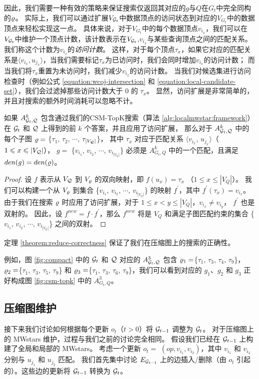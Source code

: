 因此，我们需要一种有效的策略来保证搜索仅返回其对应的$g$与$Q$在$G_t$中完全同构的$\varrho$。
实际上，我们可以通过扩展$V_{\mathcal{G}_t}$中数据顶点的访问状态到对应的$V_{G_t}$中的数据顶点来轻松实现这一点。
具体来说，对于$V_{G_t}$中的每个数据顶点$v_{i_x}$，我们可以在$V_{\mathcal{G}_t}$中维护一个顶点计数，该计数表示在$V_{\mathcal{G}_t}$,$v_{i_x}$与某些查询顶点之间的匹配关系。
我们称这个计数为$v_{i_x}$的\emph{访问计数}。
这样，对于每个顶点$\tau_x$，如果它对应的匹配关系是$\langle v_{i_x}, u_{j_x} \rangle$，当我们需要标记$\tau_x$为已访问时，我们会同时增加$v_{i_x}$的访问计数；
而当我们将$\tau_x$重置为未访问时，我们减少$v_{i_x}$的访问计数。
当我们对候选集进行访问检查时（例如公式 \ref{equation:wcoj-intersection} 和 \ref{equation:local-candidate-set}），我们会过滤掉那些访问计数大于 0 的 $\tau_x$。
显然，访问扩展是非常简单的，并且对搜索的额外时间消耗可以忽略不计。
\begin{theorem} \label{theorem:reduce-correctness}
如果 $A_{\mathcal{G}_t, \mathcal{Q}}^k$ 包含通过我们的CSM-TopK搜索（算法 \ref{alg:localmwstar:framework}）在 $\mathcal{G}_t$ 和 $\mathcal{Q}$ 上得到的前 $k$ 个答案，并且应用了访问扩展，
那么对于 $A_{\mathcal{G}_t, \mathcal{Q}}^k$ 中的每个子图 $\varrho=$ \{$\tau_1$, $\tau_2$, $\cdots$, $\tau_{|V_{\mathcal{Q}}|}$\}，
其中 $\tau_{x}$ 对应于匹配关系 $\langle v_{i_x}$, $u_{j_x}\rangle$（$1\leqslant x\leqslant |V_{\mathcal{Q}}|$），
$g=$ \{$v_{i_1}$, $v_{i_2}$, $\cdots$, $v_{i_{|V_Q|}}$\} 必须是 $A_{G_t, Q}^k$ 中的一个匹配，且满足 $den(g) = den(\varrho)$。
\end{theorem}
\begin{proof}
设 $f$ 表示从 $V_{\mathcal{Q}}$ 到 $V_{\varrho}$ 的双向映射，即 $f(u_x) = \tau_x$ （$1\leq x\leq |V_Q|$）。
我们可以构建一个从 $V_{\varrho}$ 到集合 \{$v_{i_1}$, $v_{i_2}$, $\cdots$, $v_{i_{|V_Q|}}$\} 的映射 $f^{\prime}$，其中 $f^{\prime}(\tau_x) = v_{i_x}$。
由于我们在搜索 $\varrho$ 时应用了访问扩展，对于 $1\leq x<y\leq |V_Q|$，$v_{i_x} \neq v_{i_y}$， $f^{\prime}$ 也是双射的。
因此，设 $f^{new} = f \cdot f^\prime$，那么 $f^{new}$ 将是 $V_Q$ 和满足子图匹配约束的集合 \{$v_{i_1}$, $v_{i_2}$, $\cdots$, $v_{i_{|V_Q|}}$\} 之间的双射。
\end{proof}
定理 \ref{theorem:reduce-correctness} 保证了我们在压缩图上的搜索的正确性。

例如，图 \ref{fig:compact} 中的 $\mathcal{G}_t$ 和 $\mathcal{Q}$ 对应的 $A_{\mathcal{G}_t, \mathcal{Q}}^3$ 包含 $\varrho_1=$\{$\tau_1$, $\tau_3$, $\tau_4$, $\tau_9$\}，$\varrho_2=$\{$\tau_1$, $\tau_3$, $\tau_5$, $\tau_9$\} 和 $\varrho_3=$\{$\tau_1$, $\tau_3$, $\tau_6$, $\tau_9$\}，我们可以看到对应的 $g_1$、$g_2$ 和 $g_3$ 正好构成图 \ref{fig:csm-topk} 中的 $A_{G_t, Q}^3$。

\subsection{压缩图维护}
接下来我们讨论如何根据每个更新 $o_t$（$t>0$）将 $\mathcal{G}_{t-1}$ 调整为 $\mathcal{G}_t$。
对于压缩图上的 MWstars 维护，过程与我们之前的讨论完全相同。
假设我们已经在 $\mathcal{G}_{t-1}$ 上构建了全局和局部的 MWstars。
考虑一个更新 $o_t=$ $(op, v_{i_1}, v_{i_2})$，其中 $v_{i_1}$ 和 $v_{i_2}$ 分别与 $u_{j_1}$ 和 $u_{j_2}$ 匹配。
%
我们首先集中讨论 $E_{\mathcal{G}_{t-1}}$ 上的边插入/删除（由 $o_t$ 引起的）。这些边的更新将 $\mathcal{G}_{t-1}$ 转换为 $\mathcal{G}_t$。

